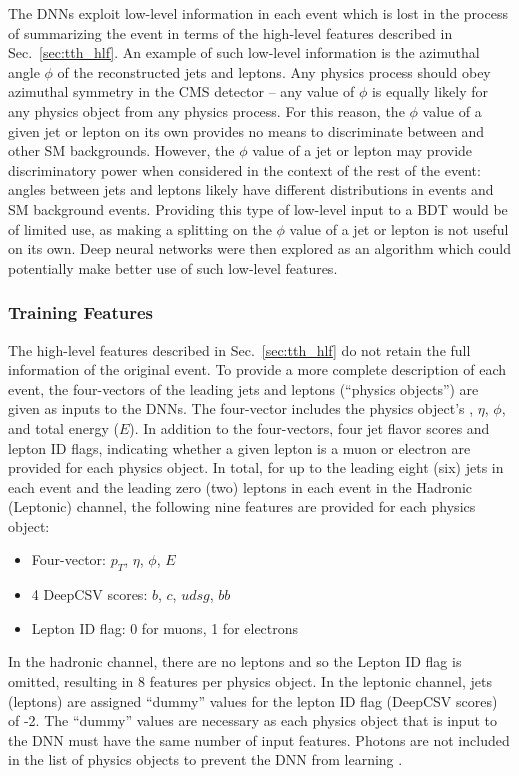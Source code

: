The DNNs exploit low-level information in each event which is lost in the process of summarizing the event in terms of the high-level features described in Sec.~\ref{sec:tth_hlf}.
An example of such low-level information is the azimuthal angle $\phi$ of the reconstructed jets and leptons.
Any physics process should obey azimuthal symmetry in the CMS detector -- any value of $\phi$ is equally likely for any physics object from any physics process.
For this reason, the $\phi$ value of a given jet or lepton on its own provides no means to discriminate between \ttH and other SM backgrounds.
However, the $\phi$ value of a jet or lepton may provide discriminatory power when considered in the context of the rest of the event: angles between jets and leptons likely have different distributions in \ttH events and SM background events.
Providing this type of low-level input to a BDT would be of limited use, as making a splitting on the $\phi$ value of a jet or lepton is not useful on its own.
Deep neural networks were then explored as an algorithm which could potentially make better use of such low-level features.

\subsubsection{Training Features}
The high-level features described in Sec.~\ref{sec:tth_hlf} do not retain the full information of the original event.
To provide a more complete description of each event, the four-vectors of the leading jets and leptons (``physics objects'') are given as inputs to the DNNs.
The four-vector includes the physics object's \pT, $\eta$, $\phi$, and total energy ($E$).
In addition to the four-vectors, four jet flavor scores and lepton ID flags, indicating whether a given lepton is a muon or electron are provided for each physics object.
In total, for up to the leading eight (six) jets in each event and the leading zero (two) leptons in each event in the Hadronic (Leptonic) channel, the following nine features are provided for each physics object:
\begin{itemize}
    \item Four-vector: $p_T$, $\eta$, $\phi$, $E$
    \item 4 DeepCSV scores: $b$, $c$, $udsg$, $bb$
    \item Lepton ID flag: 0 for muons, 1 for electrons
\end{itemize}
In the hadronic channel, there are no leptons and so the Lepton ID flag is omitted, resulting in 8 features per physics object.
In the leptonic channel, jets (leptons) are assigned ``dummy'' values for the lepton ID flag (DeepCSV scores) of -2.
The ``dummy'' values are necessary as each physics object that is input to the DNN must have the same number of input features.
Photons are not included in the list of physics objects to prevent the DNN from learning \mH.

